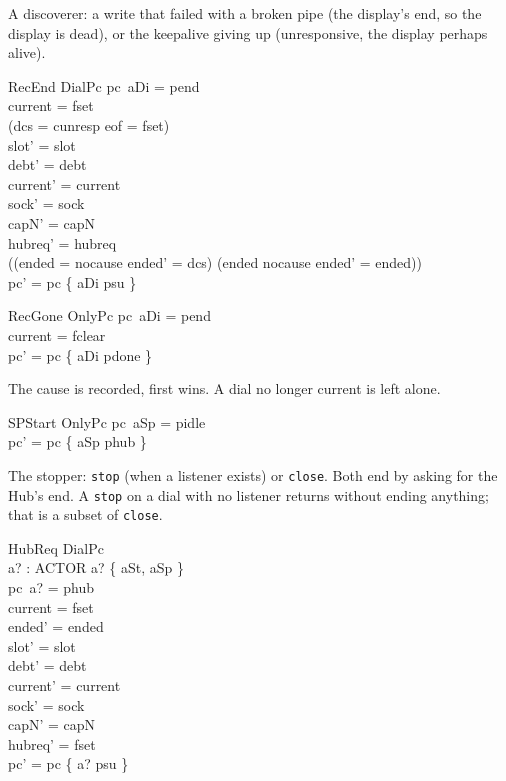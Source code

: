 \documentclass[a4paper,10pt,fleqn]{article}
\begin{document}
A discoverer: a write that failed with a broken pipe (the display's end, so the
display is dead), or the keepalive giving up (unresponsive, the display perhaps
alive).

\begin{schema}{RecEnd}
  DialPc
\where
  pc~aDi = pend \\
  current = fset \\
  (dcs = cunresp \lor eof = fset) \\
  slot' = slot \\
  debt' = debt \\
  current' = current \\
  sock' = sock \\
  capN' = capN \\
  hubreq' = hubreq \\
  ((ended = nocause \land ended' = dcs) \lor (ended \neq nocause \land ended' = ended)) \\
  pc' = pc \oplus \{ aDi \mapsto psu \}
\end{schema}

\begin{schema}{RecGone}
  OnlyPc
\where
  pc~aDi = pend \\
  current = fclear \\
  pc' = pc \oplus \{ aDi \mapsto pdone \}
\end{schema}

The cause is recorded, first wins.  A dial no longer current is left alone.

\begin{schema}{SPStart}
  OnlyPc
\where
  pc~aSp = pidle \\
  pc' = pc \oplus \{ aSp \mapsto phub \}
\end{schema}

The stopper: \texttt{stop} (when a listener exists) or \texttt{close}.  Both end
by asking for the Hub's end.  A \texttt{stop} on a dial with no listener
returns without ending anything; that is a subset of \texttt{close}.

\begin{schema}{HubReq}
  DialPc \\
  a? : ACTOR
\where
  a? \in \{ aSt, aSp \} \\
  pc~a? = phub \\
  current = fset \\
  ended' = ended \\
  slot' = slot \\
  debt' = debt \\
  current' = current \\
  sock' = sock \\
  capN' = capN \\
  hubreq' = fset \\
  pc' = pc \oplus \{ a? \mapsto psu \}
\end{schema}
\end{document}
